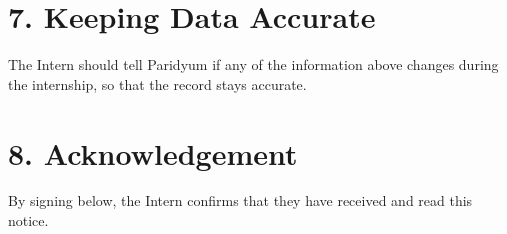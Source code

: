 \documentclass{paridyum}
\begin{document}
\section*{7. Keeping Data Accurate}
The Intern should tell Paridyum if any of the information above changes during the
internship, so that the record stays accurate.

\section*{8. Acknowledgement}
By signing below, the Intern confirms that they have received and read this notice.

\vspace{1.5em}
\paridyumsignblock

\vspace{1.5em}
\end{document}
